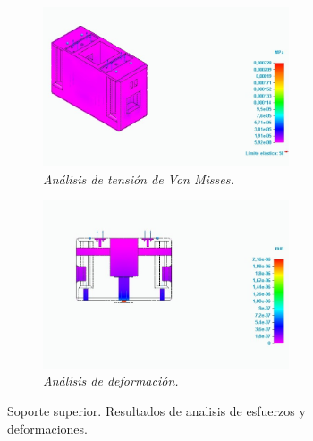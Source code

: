 \begin{figure}[H]
    \centering
    \begin{subfigure}{0.35\textwidth}
        \centering
        \includegraphics[width=0.8\textwidth]{img/completo_sin_mallar.jpg} \par
        \caption{\textit{Análisis de tensión de Von Misses.}}
        \label{fig:sup_analisis_tension}
    \end{subfigure}
    \hspace{0.5cm}
    \begin{subfigure}{0.35\textwidth}
        \centering
        \includegraphics[width=0.8\textwidth]{img/Corte_transv_sin_mallado_def.jpg} \par
        \caption{\textit{Análisis de deformación.}}
        \label{fig:sup_analisis_def}
    \end{subfigure}
    \caption{Soporte superior. Resultados de analisis de esfuerzos y deformaciones.}
\end{figure}

